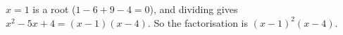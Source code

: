 $x=1$ is a root ($1-6+9-4=0$), and dividing gives $x^2-5x+4=(x-1)(x-4)$. So the factorisation is $\boxed{(x-1)^2(x-4)}$.
